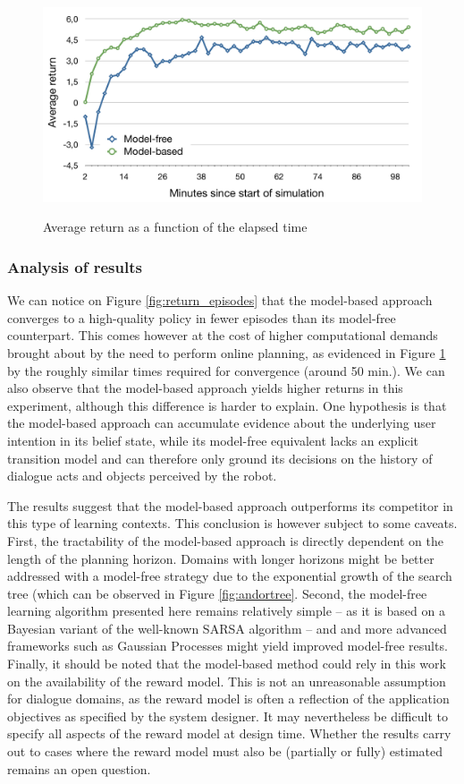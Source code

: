 \begin{figure}[h]
\centering
\includegraphics[scale=0.40]{imgs/timing.pdf}
\label{fig:return_time}
\caption{Average return as a function of the elapsed time}
\end{figure}


\subsubsection*{Analysis of results}

We can notice on Figure \ref{fig:return_episodes} that the model-based approach converges to a high-quality policy in fewer episodes than its model-free counterpart.  This comes however at the cost of higher computational demands brought about by the need to perform online planning, as evidenced in Figure \ref{fig:return_time} by the roughly similar times required for convergence (around 50 min.). We can also observe that the model-based approach yields higher returns in this experiment, although this difference is harder to explain.  One hypothesis is that the model-based approach can accumulate evidence about the underlying user intention in its belief state, while its model-free equivalent lacks an explicit transition model and can therefore only ground its decisions on the history of dialogue acts and objects perceived by the robot.

The results suggest that the model-based approach outperforms its competitor in this type of learning contexts. This conclusion is however subject to some caveats.   First, the tractability of the model-based approach is directly dependent on the length of the planning horizon. Domains with longer horizons might be better addressed with a model-free strategy due to the exponential growth of the search tree (which can be observed in Figure \ref{fig:andortree}. Second, the model-free learning algorithm presented here remains relatively simple -- as it is based on a Bayesian variant of the well-known SARSA algorithm -- and and more advanced frameworks such as Gaussian Processes \citep{gasic2011} might yield improved model-free results. Finally, it should be noted that the model-based method could rely in this work on the availability of the reward model. This is not an unreasonable assumption for dialogue domains, as the reward model is often a reflection of the application objectives as specified by the system designer. It may nevertheless be difficult to specify all aspects of the reward model at design time. Whether the results carry out to cases where the reward model must also be (partially or fully) estimated remains an open question.

